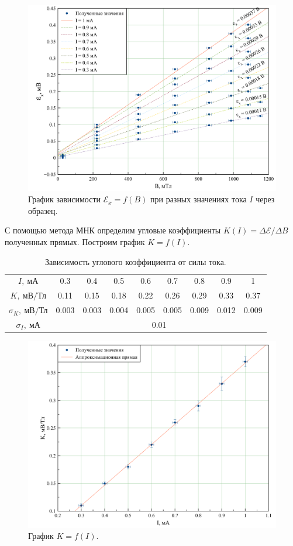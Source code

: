 \documentclass[a4paper, 12pt, twoside]{article}
\begin{document}
\begin{figure}[H]
	\begin{center}
		\includegraphics[width = 0.8 \textwidth]{grph2}
		\caption{График зависимости $\mathcal{E}_x = f(B)$ при разных значениях тока $I$ через образец.}
	\end{center}
\end{figure}

С помощью метода МНК определим угловые коэффициенты $K(I) = \Delta \mathcal{E} / \Delta B$ полученных прямых. Построим график $K = f(I)$.

\begin{table}[H]
	\centering
	\caption{Зависимость углового коэффициента от силы тока.}
	\begin{tabular}{c|cccccccc} \toprule
		$I,~\text{мА}$          & 0.3    & 0.4    & 0.5    & 0.6    & 0.7    & 0.8    & 0.9    & 1      \\
		$K,~\text{мВ/Тл}$        & 0.11  & 0.15  & 0.18  & 0.22  & 0.26  & 0.29  & 0.33  & 0.37  \\ \midrule
		$\sigma_K,~\text{мВ/Тл}$ & 0.003 & 0.003 & 0.004 & 0.005 & 0.005 & 0.009 & 0.012 & 0.009 \\
		$\sigma_I,~\text{мА}$   &  \multicolumn{8}{c}{0.01}   \\ \bottomrule                                          
	\end{tabular}
\end{table}

\begin{figure}[H]
	\begin{center}
		\includegraphics[width = 0.8 \textwidth]{grph3}
		\caption{График $K = f(I)$.}
	\end{center}
\end{figure}
\end{document}

